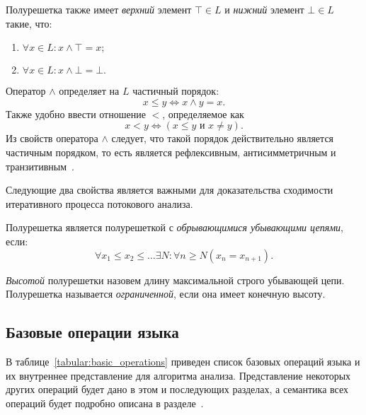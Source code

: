 \documentclass[14pt,titlepage,draft]{extarticle}
\newcommand{\java}{\eng{Java}\xspace}
\newcommand{\meet}{\wedge}
\begin{document}
    Полурешетка также имеет \emph{верхний} элемент $\top \in L$ и \emph{нижний}
    элемент $\bot \in L$ такие, что:
    \begin{enumerate}
      \item $\forall x \in L \colon x \meet \top = x;$
      \item $\forall x \in L \colon x \meet \bot = \bot.$
    \end{enumerate}

    Оператор $\meet$ определяет на $L$ частичный порядок:
    \[x \leq y \Leftrightarrow x \meet y = x.\]
    Также удобно ввести отношение $<$, определяемое как
    \[x < y \Leftrightarrow (x \leq y \text{ и } x \ne y).\]
    Из свойств оператора $\meet$ следует, что такой порядок действительно
    является частичным порядком, то есть является рефлексивным,
    антисимметричным и транзитивным~\cite{muchnick}.

    Следующие два свойства является важными для доказательства сходимости
    итеративного процесса потокового анализа.

    Полурешетка является полурешеткой с \emph{обрывающимися убывающими цепями},
    если:
    \[\forall x_1 \leq x_2 \leq \ldots \exists N\colon
      \forall n \geq N (x_n = x_{n+1}).\]

    \emph{Высотой} полурешетки назовем длину максимальной строго убывающей
    цепи. Полурешетка называется \emph{ограниченной}, если она имеет конечную
    высоту.





  \subsection{Базовые операции языка \texorpdfstring{\java}{Java}}
    \label{section:java_ops}

    В таблице~\ref{tabular:basic_operations} приведен список базовых операций
    языка \java и их внутреннее представление для алгоритма анализа.
    Представление некоторых других операций будет дано в этом и последующих
    разделах, а семантика всех операций будет подробно описана в
    разделе~\todoref.
\end{document}
